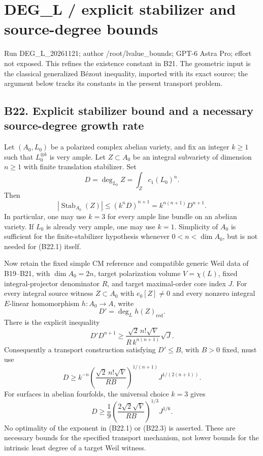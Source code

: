 \providecommand{\tightlist}{\setlength{\itemsep}{0pt}\setlength{\parskip}{0pt}}
\section{DEG\_L / explicit stabilizer and source-degree bounds}\label{deg_l-explicit-stabilizer-and-source-degree-bounds}

Run DEG\_L\_20261121; author /root/lvalue\_bounds; GPT-6 Astra Pro; effort not exposed. This refines the existence constant in B21. The geometric input is the classical generalized Bézout inequality, imported with its exact source; the argument below tracks its constants in the present transport problem.

\subsection{B22. Explicit stabilizer bound and a necessary source-degree growth rate}\label{b22.-explicit-stabilizer-bound-and-a-necessary-source-degree-growth-rate}

Let \((A_0,L_0)\) be a polarized complex abelian variety, and fix an integer \(k\ge1\) such that \(L_0^{\otimes k}\) is very ample. Let \(Z\subset A_0\) be an integral subvariety of dimension \(n\ge1\) with finite translation stabilizer. Set \[
 D=\deg_{L_0}Z=\int_Zc_1(L_0)^n.
\] Then \[
 |\operatorname{Stab}_{A_0}(Z)|
 \le (k^nD)^{n+1}
 =k^{n(n+1)}D^{n+1}.
\tag{B22.1}
\] In particular, one may use \(k=3\) for every ample line bundle on an abelian variety. If \(L_0\) is already very ample, one may use \(k=1\). Simplicity of \(A_0\) is sufficient for the finite-stabilizer hypothesis whenever \(0<n<\dim A_0\), but is not needed for (B22.1) itself.

Now retain the fixed simple CM reference and compatible generic Weil data of B19--B21, with \(\dim A_0=2n\), target polarization volume \(V=\chi(L)\), fixed integral-projector denominator \(R\), and target maximal-order core index \(J\). For every integral source witness \(Z\subset A_0\) with \(e_0[Z]\ne0\) and every nonzero integral \(E\)-linear homomorphism \(h:A_0\to A\), write \[
 D'=\deg_Lh(Z)_{\mathrm{red}}.
\] There is the explicit inequality \[
 D'D^{n+1}
 \ge
 \frac{\sqrt2\,n!\sqrt V}{R\,k^{n(n+1)}}\sqrt J.
\tag{B22.2}
\] Consequently a transport construction satisfying \(D'\le B\), with \(B>0\) fixed, must use \[
 D\ge k^{-n}
 \left(\frac{\sqrt2\,n!\sqrt V}{RB}\right)^{1/(n+1)}
 J^{1/(2(n+1))}.
\tag{B22.3}
\] For surfaces in abelian fourfolds, the universal choice \(k=3\) gives \[
 D\ge\frac19
 \left(\frac{2\sqrt2\sqrt V}{RB}\right)^{1/3}J^{1/6}.
\tag{B22.4}
\] No optimality of the exponent in (B22.1) or (B22.3) is asserted. These are necessary bounds for the specified transport mechanism, not lower bounds for the intrinsic least degree of a target Weil witness.

